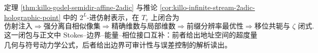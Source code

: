 \begin{remark}\label{rem:killo-2adic-holographic-closure}
定理 \ref{thm:killo-godel-semidir-affine-2adic} 与推论 \ref{cor:killo-infinite-stream-2adic-holographic-point} 中的 \(2^L\)-进仿射表示，在 \(T_v\) 上闭合为
\[
\text{仿射注入}
\Longrightarrow
\text{强分离自相似像集}
\Longrightarrow
\text{精确维数与局部维数}
\Longrightarrow
\text{前缀分辨率最优性}
\Longrightarrow
\text{移位共轭与 }\zeta\text{ 闭式}.
\]
这一闭包与正文中 Stokes--边界--能量--相位接口互补：前者给出地址空间的超度量几何与符号动力学公式，后者给出边界可审计性与误差控制的解析读出。
\end{remark}
